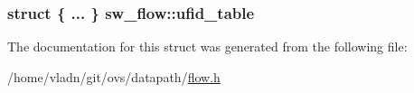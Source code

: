 \subsubsection[{ufid\+\_\+table}]{\setlength{\rightskip}{0pt plus 5cm}struct \{ ... \}   sw\+\_\+flow\+::ufid\+\_\+table}\label{structsw__flow_af5dad10ae036092f5a26cfebb050a03a}


The documentation for this struct was generated from the following file\+:\begin{DoxyCompactItemize}
\item 
/home/vladn/git/ovs/datapath/\hyperlink{flow_8h}{flow.\+h}\end{DoxyCompactItemize}
